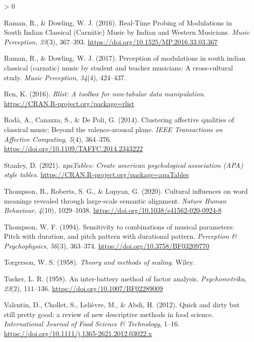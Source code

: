 \documentclass[
  english,
  man]{apa6}
\newlength{\cslhangindent}
\newenvironment{CSLReferences}[2] %
 {%
  \setlength{\parindent}{0pt}
  \ifodd #1 \everypar{\setlength{\hangindent}{\cslhangindent}}\ignorespaces\fi
  \ifnum #2 > 0
  \setlength{\parskip}{#2\baselineskip}
  \fi
 }%
 {}
\begin{document}
\begin{CSLReferences}{1}{0}
\leavevmode\hypertarget{ref-Raman2016}{}%
Raman, R., \& Dowling, W. J. (2016). {Real-Time Probing of Modulations in South Indian Classical (Carnātic) Music by Indian and Western Musicians}. \emph{Music Perception}, \emph{33}(3), 367--393. \url{https://doi.org/10.1525/MP.2016.33.03.367}

\leavevmode\hypertarget{ref-Raman2017}{}%
Raman, R., \& Dowling, W. J. (2017). {Perception of modulations in south indian classical (carnatic) music by student and teacher musicians: A cross-cultural study}. \emph{Music Perception}, \emph{34}(4), 424--437.

\leavevmode\hypertarget{ref-R-rlist}{}%
Ren, K. (2016). \emph{Rlist: A toolbox for non-tabular data manipulation}. \url{https://CRAN.R-project.org/package=rlist}

\leavevmode\hypertarget{ref-Roda2014}{}%
Rodà, A., Canazza, S., \& De Poli, G. (2014). {Clustering affective qualities of classical music: Beyond the valence-arousal plane}. \emph{IEEE Transactions on Affective Computing}, \emph{5}(4), 364--376. \url{https://doi.org/10.1109/TAFFC.2014.2343222}

\leavevmode\hypertarget{ref-R-apaTables}{}%
Stanley, D. (2021). \emph{apaTables: Create american psychological association (APA) style tables}. \url{https://CRAN.R-project.org/package=apaTables}

\leavevmode\hypertarget{ref-Thompson2020}{}%
Thompson, B., Roberts, S. G., \& Lupyan, G. (2020). {Cultural influences on word meanings revealed through large-scale semantic alignment}. \emph{Nature Human Behaviour}, \emph{4}(10), 1029--1038. \url{https://doi.org/10.1038/s41562-020-0924-8}

\leavevmode\hypertarget{ref-Thompson1994}{}%
Thompson, W. F. (1994). {Sensitivity to combinations of musical parameters: Pitch with duration, and pitch pattern with durational pattern}. \emph{Perception {\&} Psychophysics}, \emph{56}(3), 363--374. \url{https://doi.org/10.3758/BF03209770}

\leavevmode\hypertarget{ref-Torgerson1958}{}%
Torgerson, W. S. (1958). \emph{{Theory and methods of scaling}}. Wiley.

\leavevmode\hypertarget{ref-Tucker1958}{}%
Tucker, L. R. (1958). {An inter-battery method of factor analysis}. \emph{Psychometrika}, \emph{23}(2), 111--136. \url{https://doi.org/10.1007/BF02289009}

\leavevmode\hypertarget{ref-Valentin2012}{}%
Valentin, D., Chollet, S., Lelièvre, M., \& Abdi, H. (2012). {Quick and dirty but still pretty good: a review of new descriptive methods in food science}. \emph{International Journal of Food Science {\&} Technology}, 1--16. \url{https://doi.org/10.1111/j.1365-2621.2012.03022.x}


\end{CSLReferences}
\end{document}

